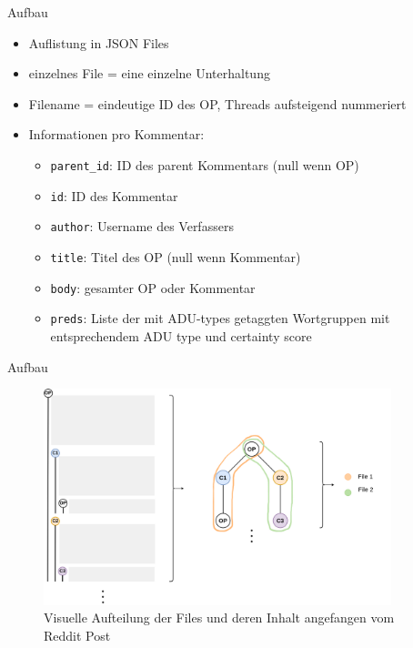 \documentclass[compress,12pt]{beamer}
\begin{document}
    \begin{frame}{Aufbau}
        \begin{itemize}
            \item Auflistung in JSON Files
            \item einzelnes File = eine einzelne Unterhaltung
            \item Filename = eindeutige ID des OP, Threads aufsteigend nummeriert
            \item Informationen pro Kommentar:
            \begin{itemize}
                \item \texttt{parent\_id}: ID des parent Kommentars (null wenn OP)
                \item \texttt{id}: ID des Kommentar
                \item \texttt{author}: Username des Verfassers
                \item \texttt{title}: Titel des OP (null wenn Kommentar)
                \item \texttt{body}: gesamter OP oder Kommentar
                \item \texttt{preds}: Liste der mit ADU-types getaggten Wortgruppen mit entsprechendem ADU type und certainty score
            \end{itemize}
        \end{itemize}
    \end{frame}

    \begin{frame}{Aufbau}
        \begin{figure}
            \centering
            \includegraphics[width=0.9\textwidth]{../images/data-files-structure}
            \caption{Visuelle Aufteilung der Files und deren Inhalt angefangen vom Reddit Post}
            \label{fig:data-structure}
        \end{figure}
    \end{frame}
\end{document}
